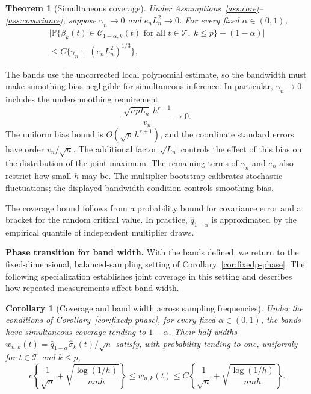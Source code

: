 \documentclass[12pt]{article}
\newtheorem{theorem}{Theorem}
\newtheorem{corollary}{Corollary}
\newcommand{\prob}{\mathbb{P}}
\newcommand{\wh}{\widehat}
\numberwithin{equation}{section}
\begin{document}
\begin{theorem}[Simultaneous coverage]\label{thm:coverage}
Under Assumptions~\ref{ass:core}--\ref{ass:covariance}, suppose
$\gamma_n\to0$ and $e_nL_n^2\to0$. For every fixed $\alpha\in(0,1)$,
\begin{equation*}
\begin{split}
\Big|\prob\{\beta_k(t)\in\mathcal C_{1-\alpha,k}(t)
\text{ for all }t\in\mathcal T,\ k\le p\}-(1-\alpha)\Big|\\
\le C\{\gamma_n+(e_nL_n^2)^{1/3}\}.
\end{split}
\end{equation*}
\end{theorem}

The bands use the uncorrected local polynomial estimate, so the bandwidth
must make smoothing bias negligible for simultaneous inference. In
particular, $\gamma_n\to0$ includes the undersmoothing requirement
\begin{equation}
\frac{\sqrt{npL_n}\,h^{r+1}}{v_n}\to0.
\label{eq:vcm-undersmoothing}
\end{equation}
The uniform bias bound is $O(\sqrt p\,h^{r+1})$, and the coordinate
standard errors have order $v_n/\sqrt n$. The additional factor
$\sqrt{L_n}$ controls the effect of this bias on the distribution of the
joint maximum. The remaining terms of $\gamma_n$ and $e_n$ also restrict
how small $h$ may be. The multiplier bootstrap calibrates stochastic
fluctuations; the displayed bandwidth condition controls smoothing bias.

The coverage bound follows from a probability bound for covariance error
and a bracket for the random critical value. In practice, $\wh q_{1-\alpha}$
is approximated by the empirical quantile of independent multiplier draws.

\noindent\textbf{Phase transition for band width.}
With the bands defined, we return to the fixed-dimensional,
balanced-sampling setting of Corollary~\ref{cor:fixedp-phase}.
The following specialization establishes joint coverage in this setting
and describes how repeated measurements affect band width.

\begin{corollary}[Coverage and band width across sampling frequencies]
\label{cor:fixedp-width}
Under the conditions of Corollary~\ref{cor:fixedp-phase}, for every fixed
$\alpha\in(0,1)$, the bands have simultaneous coverage tending to
$1-\alpha$. Their half-widths
$w_{n,k}(t)=\wh q_{1-\alpha}\wh\sigma_k(t)/\sqrt n$ satisfy, with
probability tending to one, uniformly for $t\in\mathcal T$ and $k\le p$,
\begin{equation}
c\left\{\frac1{\sqrt n}+\sqrt{\frac{\log(1/h)}{nmh}}\right\}
\le w_{n,k}(t)\le
C\left\{\frac1{\sqrt n}+\sqrt{\frac{\log(1/h)}{nmh}}\right\}.
\label{eq:fixedp-phase-width}
\end{equation}
\end{corollary}
\end{document}
